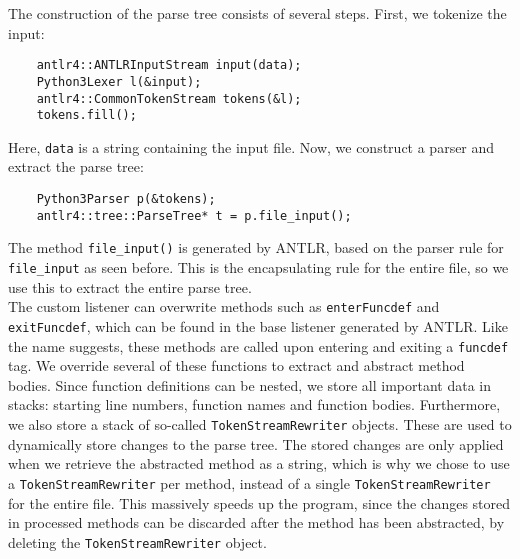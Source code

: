 \documentclass[../Main.tex]{subfiles}
\begin{document}
The construction of the parse tree consists of several steps. First, we tokenize the input:\\
\begin{lstlisting}
    antlr4::ANTLRInputStream input(data);
    Python3Lexer l(&input);
    antlr4::CommonTokenStream tokens(&l);
    tokens.fill();
\end{lstlisting}
\vspace{15pt}
Here, \texttt{data} is a string containing the input file. Now, we construct a parser and extract the parse tree:
\begin{lstlisting}
	Python3Parser p(&tokens);
    antlr4::tree::ParseTree* t = p.file_input();
\end{lstlisting}
\vspace{15pt}
The method \texttt{file\_input()} is generated by ANTLR, based on the parser rule for \texttt{file\_input} as seen before. This is the encapsulating rule for the entire file, so we use this to extract the entire parse tree.\\

The custom listener can overwrite methods such as \texttt{enterFuncdef} and \texttt{exitFuncdef}, which can be found in the base listener generated by ANTLR. Like the name suggests, these methods are called upon entering and exiting a \texttt{funcdef} tag. We override several of these functions to extract and abstract method bodies. Since function definitions can be nested, we store all important data in stacks: starting line numbers, function names and function bodies. Furthermore, we also store a stack of so-called \texttt{TokenStreamRewriter} objects. These are used to dynamically store changes to the parse tree. The stored changes are only applied when we retrieve the abstracted method as a string, which is why we chose to use a \texttt{TokenStreamRewriter} per method, instead of a single \texttt{TokenStreamRewriter} for the entire file. This massively speeds up the program, since the changes stored in processed methods can be discarded after the method has been abstracted, by deleting the \texttt{TokenStreamRewriter} object.\\
\end{document}
